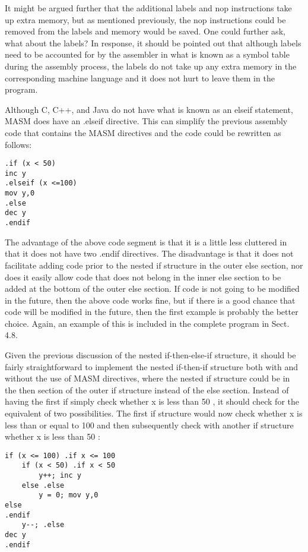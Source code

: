 \documentclass[10pt]{article}
\begin{document}
It might be argued further that the additional labels and nop instructions take up extra memory, but as mentioned previously, the nop instructions could be removed from the labels and memory would be saved. One could further ask, what about the labels? In response, it should be pointed out that although labels need to be accounted for by the assembler in what is known as a symbol table during the assembly process, the labels do not take up any extra memory in the corresponding machine language and it does not hurt to leave them in the program.

Although C, C++, and Java do not have what is known as an elseif statement, MASM does have an .elseif directive. This can simplify the previous assembly code that contains the MASM directives and the code could be rewritten as follows:

\begin{verbatim}
.if (x < 50)
inc y
.elseif (x <=100)
mov y,0
.else
dec y
.endif
\end{verbatim}

The advantage of the above code segment is that it is a little less cluttered in that it does not have two .endif directives. The disadvantage is that it does not facilitate adding code prior to the nested if structure in the outer else section, nor does it easily allow code that does not belong in the inner else section to be added at the bottom of the outer else section. If code is not going to be modified in the future, then the above code works fine, but if there is a good chance that code will be modified in the future, then the first example is probably the better choice. Again, an example of this is included in the complete program in Sect. 4.8.

Given the previous discussion of the nested if-then-else-if structure, it should be fairly straightforward to implement the nested if-then-if structure both with and without the use of MASM directives, where the nested if structure could be in the then section of the outer if structure instead of the else section. Instead of having the first if simply check whether x is less than 50 , it should check for the equivalent of two possibilities. The first if structure would now check whether x is less than or equal to 100 and then subsequently check with another if structure whether x is less than 50 :

\begin{verbatim}
if (x <= 100) .if x <= 100
    if (x < 50) .if x < 50
        y++; inc y
    else .else
        y = 0; mov y,0
else
.endif
    y--; .else
dec y
.endif
\end{verbatim}
\end{document}
